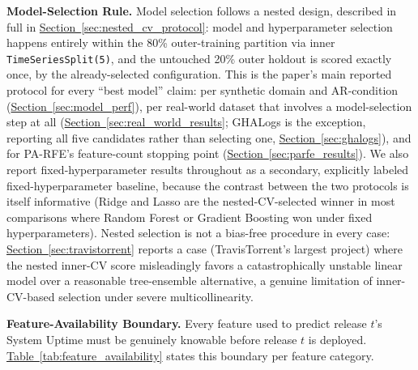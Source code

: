 \documentclass[technologies,article,submit,pdftex,moreauthors]{Definitions/mdpi}
\begin{document}
\textbf{Model-Selection Rule.} Model selection follows a nested design, described in full in \hyperref[sec:nested_cv_protocol]{Section~\ref*{sec:nested_cv_protocol}}: model and hyperparameter selection happens entirely within the 80\% outer-training partition via inner \texttt{TimeSeriesSplit(5)}, and the untouched 20\% outer holdout is scored exactly once, by the already-selected configuration. This is the paper's main reported protocol for every ``best model'' claim: per synthetic domain and AR-condition (\hyperref[sec:model_perf]{Section~\ref*{sec:model_perf}}), per real-world dataset that involves a model-selection step at all (\hyperref[sec:real_world_results]{Section~\ref*{sec:real_world_results}}; GHALogs is the exception, reporting all five candidates rather than selecting one, \hyperref[sec:ghalogs]{Section~\ref*{sec:ghalogs}}), and for PA-RFE's feature-count stopping point (\hyperref[sec:parfe_results]{Section~\ref*{sec:parfe_results}}). We also report fixed-hyperparameter results throughout as a secondary, explicitly labeled fixed-hyperparameter baseline, because the contrast between the two protocols is itself informative (Ridge and Lasso are the nested-CV-selected winner in most comparisons where Random Forest or Gradient Boosting won under fixed hyperparameters). Nested selection is not a bias-free procedure in every case: \hyperref[sec:travistorrent]{Section~\ref*{sec:travistorrent}} reports a case (TravisTorrent's largest project) where the nested inner-CV score misleadingly favors a catastrophically unstable linear model over a reasonable tree-ensemble alternative, a genuine limitation of inner-CV-based selection under severe multicollinearity.

\textbf{Feature-Availability Boundary.} Every feature used to predict release \(t\)'s System Uptime must be genuinely knowable before release \(t\) is deployed. \hyperref[tab:feature_availability]{Table~\ref*{tab:feature_availability}} states this boundary per feature category.
\end{document}

